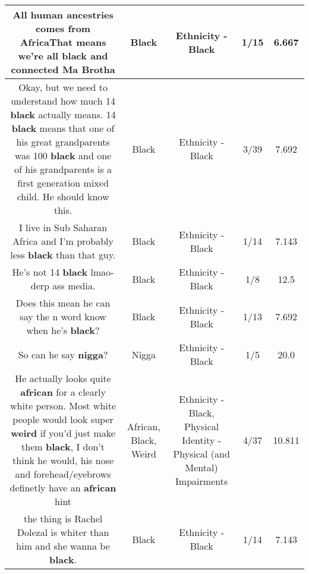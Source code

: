 \documentclass[11pt]{article}
\newlength\mylength
\begin{document}
\begin{center}
\begin{longtable}{|C{.65\mylength}|C{.30\mylength}|C{.12\mylength}|C{.12\mylength}|C{.12\mylength}|}
  \small All human ancestries comes from AfricaThat means we're all \textbf{black} and connected Ma Brotha\normalsize   & Black & Ethnicity - Black & 1/15 & 6.667 \\  \hline
  \small Okay, but we need to understand how much 14 \textbf{black} actually means. 14 \textbf{black} means that one of his great grandparents was 100 \textbf{black} and one of his grandparents is a first generation mixed child. He should know this.\normalsize   & Black & Ethnicity - Black & 3/39 & 7.692 \\  \hline
  \small I live in Sub Saharan Africa and I'm probably less \textbf{black} than that guy.\normalsize   & Black & Ethnicity - Black & 1/14 & 7.143 \\  \hline
  \small He's not 14 \textbf{black} lmao- derp ass media.\normalsize   & Black & Ethnicity - Black & 1/8 & 12.5 \\  \hline
  \small Does this mean he can say the n word know when he's \textbf{black}?\normalsize   & Black & Ethnicity - Black & 1/13 & 7.692 \\  \hline
  \small So can he say \textbf{nigga}?\normalsize   & Nigga & Ethnicity - Black & 1/5 & 20.0 \\  \hline
  \small He actually looks quite \textbf{african} for a clearly white person. Most white people would look super \textbf{weird} if you'd just make them \textbf{black}, I don't think he would, his nose and forehead/eyebrows definetly have an \textbf{african} hint\normalsize   & African, Black, Weird & Ethnicity - Black, Physical Identity - Physical (and Mental) Impairments & 4/37 & 10.811 \\  \hline
  \small the thing is Rachel Dolezal is whiter than him and she wanna be \textbf{black}.\normalsize   & Black & Ethnicity - Black & 1/14 & 7.143 \\  \hline

\end{longtable}
\end{center}
\end{document}
